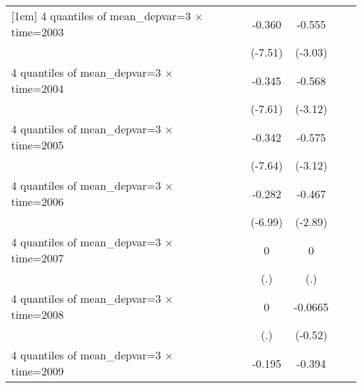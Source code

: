 \begin{table}[htbp]
\begin{tabular}{l*{6}{c}}
[1em]
4 quantiles of mean\_depvar=3 $\times$ time=2003&                     &                     &      -0.360\sym{***}&      -0.555\sym{***}&                     &                     \\
                    &                     &                     &     (-7.51)         &     (-3.03)         &                     &                     \\
[1em]
4 quantiles of mean\_depvar=3 $\times$ time=2004&                     &                     &      -0.345\sym{***}&      -0.568\sym{***}&                     &                     \\
                    &                     &                     &     (-7.61)         &     (-3.12)         &                     &                     \\
[1em]
4 quantiles of mean\_depvar=3 $\times$ time=2005&                     &                     &      -0.342\sym{***}&      -0.575\sym{***}&                     &                     \\
                    &                     &                     &     (-7.64)         &     (-3.12)         &                     &                     \\
[1em]
4 quantiles of mean\_depvar=3 $\times$ time=2006&                     &                     &      -0.282\sym{***}&      -0.467\sym{***}&                     &                     \\
                    &                     &                     &     (-6.99)         &     (-2.89)         &                     &                     \\
[1em]
4 quantiles of mean\_depvar=3 $\times$ time=2007&                     &                     &           0         &           0         &                     &                     \\
                    &                     &                     &         (.)         &         (.)         &                     &                     \\
[1em]
4 quantiles of mean\_depvar=3 $\times$ time=2008&                     &                     &           0         &     -0.0665         &                     &                     \\
                    &                     &                     &         (.)         &     (-0.52)         &                     &                     \\
[1em]
4 quantiles of mean\_depvar=3 $\times$ time=2009&                     &                     &      -0.195\sym{***}&      -0.394\sym{***}&                     &                     \\

\end{tabular}
\end{table}

